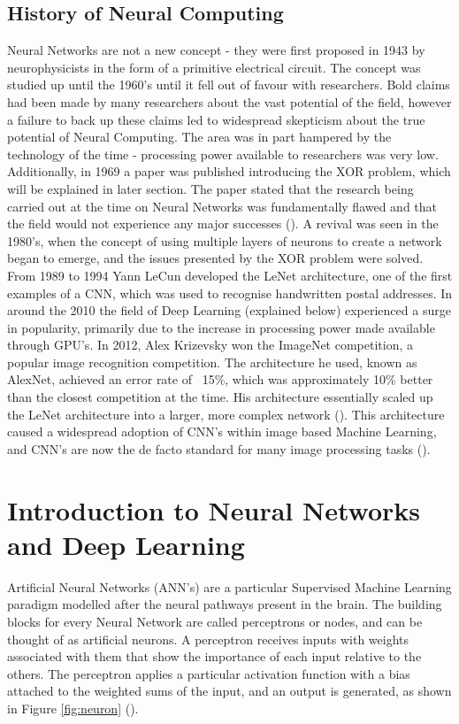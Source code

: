 \documentclass[12pt]{report}
\begin{document}
\subsection{History of Neural Computing}
\begin{flushleft}
Neural Networks are not a new concept - they were first proposed in 1943 by neurophysicists in the form of a primitive electrical circuit. The concept was studied up until the 1960's until it fell out of favour with researchers. Bold claims had been made by many researchers about the vast potential of the field, however a failure to back up these claims led to widespread skepticism about the true potential of Neural Computing. The area was in part hampered by the technology of the time - processing power available to researchers was very low. Additionally, in 1969 a paper was published introducing the XOR problem, which will be explained in later section. The paper stated that the research being carried out at the time on Neural Networks was fundamentally flawed and that the field would not experience any major successes (\cite{minsky1969introduction}). A revival was seen in the 1980's, when the concept of using multiple layers of neurons to create a network began to emerge, and the issues presented by the XOR problem were solved. From 1989 to 1994 Yann LeCun developed the LeNet architecture, one of the first examples of a CNN, which was used to recognise handwritten postal addresses. In around the 2010 the field of Deep Learning (explained below) experienced a surge in popularity, primarily due to the increase in processing power made available through GPU's. In 2012, Alex Krizevsky won the ImageNet competition, a popular image recognition competition. The architecture he used, known as AlexNet, achieved an error rate of ~15\%, which was approximately 10\% better than the closest competition at the time. His architecture essentially scaled up the LeNet architecture into a larger, more complex network (\cite{krizhevsky2012imagenet}). This architecture caused a widespread adoption of CNN's within image based Machine Learning, and CNN's are now the de facto standard for many image processing tasks (\cite{o2015introduction}).
\end{flushleft}

\section{Introduction to Neural Networks and Deep Learning}

\begin{flushleft}
Artificial Neural Networks (ANN's) are a particular Supervised Machine Learning paradigm modelled after the neural pathways present in the brain. The building blocks for every Neural Network are called perceptrons or nodes, and can be thought of as artificial neurons. A perceptron receives inputs with weights associated with them that show the importance of each input relative to the others. The perceptron applies a particular activation function with a bias attached to the weighted sums of the input, and an output is generated, as shown in Figure \ref{fig:neuron} (\cite{geron2017hands}).
\end{flushleft}
\end{document}
